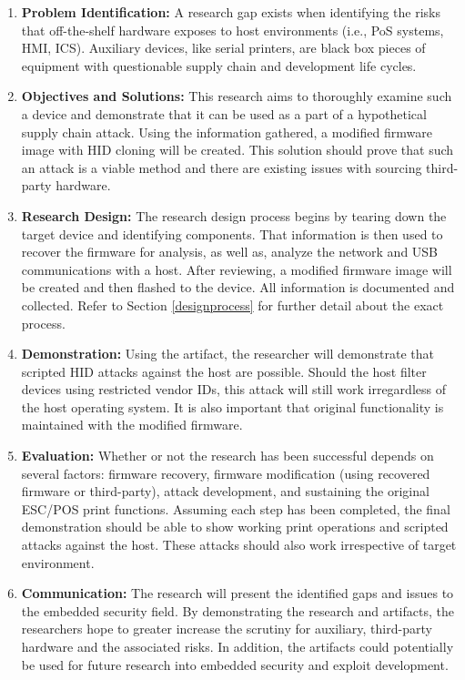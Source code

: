 \begin{enumerate}[label=\Roman*.]
  \item \textbf{Problem Identification:} A research gap exists when identifying the risks that off-the-shelf hardware exposes to host environments (i.e., PoS systems, HMI, ICS). Auxiliary devices, like serial printers, are black box pieces of equipment with questionable supply chain and development life cycles.
  \item \textbf{Objectives and Solutions:} This research aims to thoroughly examine such a device and demonstrate that it can be used as a part of a hypothetical supply chain attack. Using the information gathered, a modified firmware image with HID cloning will be created. This solution should prove that such an attack is a viable method and there are existing issues with sourcing third-party hardware.
  \item \textbf{Research Design:} The research design process begins by tearing down the target device and identifying components. That information is then used to recover the firmware for analysis, as well as, analyze the network and USB communications with a host. After reviewing, a modified firmware image will be created and then flashed to the device. All information is documented and collected. Refer to Section \ref{designprocess} for further detail about the exact process.
  \item \textbf{Demonstration:} Using the artifact, the researcher will demonstrate that scripted HID attacks against the host are possible. Should the host filter devices using restricted vendor IDs, this attack will still work irregardless of the host operating system. It is also important that original functionality is maintained with the modified firmware.
  \item \textbf{Evaluation:} Whether or not the research has been successful depends on several factors: firmware recovery, firmware modification (using recovered firmware or third-party), attack development, and sustaining the original ESC/POS print functions. Assuming each step has been completed, the final demonstration should be able to show working print operations and scripted attacks against the host. These attacks should also work irrespective of target environment.
  \item \textbf{Communication:} The research will present the identified gaps and issues to the embedded security field. By demonstrating the research and artifacts, the researchers hope to greater increase the scrutiny for auxiliary, third-party hardware and the associated risks. In addition, the artifacts could potentially be used for future research into embedded security and exploit development.
\end{enumerate}

